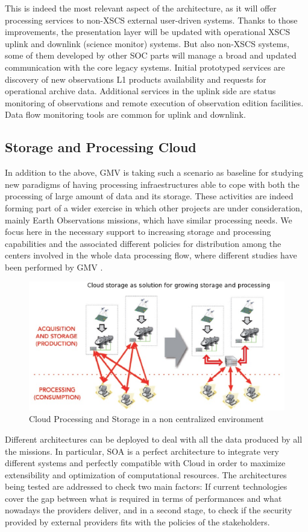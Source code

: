 \documentclass[11pt,twoside]{article}
\begin{document}
This is indeed the most relevant aspect of the architecture, as it will offer processing services to non-XSCS external user-driven systems. Thanks to those improvements, the presentation layer will be updated with operational XSCS uplink and downlink (science monitor) systems. But also non-XSCS systems, some of them developed by other SOC parts will manage a broad and updated communication with the core legacy systems. Initial prototyped services are discovery of new observations L1 products availability and requests for operational archive data. Additional services in the uplink side are status monitoring of observations and remote execution of observation edition facilities. Data flow monitoring tools are common for uplink and downlink. 
\subsection{Storage and Processing Cloud}
In addition to the above, GMV is taking such a scenario as baseline for studying  new paradigms of having processing infraestructures  able to cope with both the processing of large amount of data and its storage.
These activities  are indeed forming part of a wider exercise in which other projects are under 
consideration, mainly Earth Observations missions, which have similar processing needs. We focus here in the necessary support to increasing storage and processing capabilities and the 
associated different policies for distribution among the centers involved in the whole data processing flow, where different studies have been performed by GMV \cite{RubenPerez1}.
\begin{figure}[h]
\centering
\includegraphics[width=80 mm]{P022_f3.eps}
\caption{Cloud Processing and Storage in a non centralized environment}
\label{fig3}
\end{figure}
Different architectures can be deployed to deal with all the data
produced by all the missions. In particular, SOA is a perfect architecture to integrate very different systems and perfectly compatible with Cloud in order to maximize extensibility and optimization of computational resources. The architectures being tested are addressed to check two main factors: If current technologies cover the gap between what is required in terms of
performances and what nowadays the providers deliver, and in a second stage, to check
if the security provided by external providers fits with the policies of the stakeholders.
\end{document}
